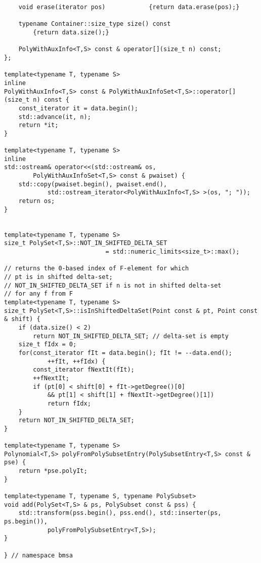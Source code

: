\begin{lstlisting}
    void erase(iterator pos)            {return data.erase(pos);}

    typename Container::size_type size() const   
        {return data.size();}

    PolyWithAuxInfo<T,S> const & operator[](size_t n) const;
};

template<typename T, typename S>
inline
PolyWithAuxInfo<T,S> const & PolyWithAuxInfoSet<T,S>::operator[](size_t n) const {
    const_iterator it = data.begin();
    std::advance(it, n);
    return *it;
}

template<typename T, typename S>
inline
std::ostream& operator<<(std::ostream& os,
        PolyWithAuxInfoSet<T,S> const & pwaiset) {
    std::copy(pwaiset.begin(), pwaiset.end(),
            std::ostream_iterator<PolyWithAuxInfo<T,S> >(os, "; "));
    return os;
}


template<typename T, typename S>
size_t PolySet<T,S>::NOT_IN_SHIFTED_DELTA_SET
                            = std::numeric_limits<size_t>::max();

// returns the 0-based index of F-element for which 
// pt is in shifted delta-set;
// NOT_IN_SHIFTED_DELTA_SET if n is not in shifted delta-set 
// for any f from F
template<typename T, typename S>
size_t PolySet<T,S>::isInShiftedDeltaSet(Point const & pt, Point const & shift) {
    if (data.size() < 2)
        return NOT_IN_SHIFTED_DELTA_SET; // delta-set is empty
    size_t fIdx = 0;
    for(const_iterator fIt = data.begin(); fIt != --data.end();
            ++fIt, ++fIdx) {
        const_iterator fNextIt(fIt);
        ++fNextIt;
        if (pt[0] < shift[0] + fIt->getDegree()[0]
            && pt[1] < shift[1] + fNextIt->getDegree()[1])
            return fIdx;
    }
    return NOT_IN_SHIFTED_DELTA_SET;
}

template<typename T, typename S>
Polynomial<T,S> polyFromPolySubsetEntry(PolySubsetEntry<T,S> const & pse) {
    return *pse.polyIt;
}

template<typename T, typename S, typename PolySubset>
void add(PolySet<T,S> & ps, PolySubset const & pss) {
    std::transform(pss.begin(), pss.end(), std::inserter(ps, ps.begin()),
            polyFromPolySubsetEntry<T,S>);
}
    
} // namespace bmsa
\end{lstlisting}

